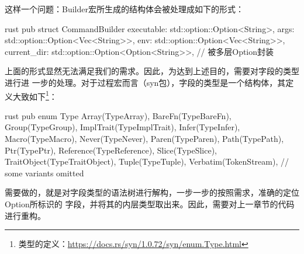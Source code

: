这样一个问题：Builder宏所生成的结构体会被处理成如下的形式：
\begin{code-block}{rust}
pub struct CommandBuilder {
    executable: std::option::Option<String>,
    args: std::option::Option<Vec<String>>,
    env: std::option::Option<Vec<String>>,
    current_dir: std::option::Option<Option<String>>,   // 被多层Option封装
}
\end{code-block}
上面的形式显然无法满足我们的需求。因此，为达到上述目的，需要对字段的类型进行进
一步的处理。对于过程宏而言（syn包），字段的类型是一个结构体，其定义大致如下\footnote{类型的定义：\url{https://docs.rs/syn/1.0.72/syn/enum.Type.html}}：
\begin{code-block}{rust}
pub enum Type {
    Array(TypeArray),
    BareFn(TypeBareFn),
    Group(TypeGroup),
    ImplTrait(TypeImplTrait),
    Infer(TypeInfer),
    Macro(TypeMacro),
    Never(TypeNever),
    Paren(TypeParen),
    Path(TypePath),
    Ptr(TypePtr),
    Reference(TypeReference),
    Slice(TypeSlice),
    TraitObject(TypeTraitObject),
    Tuple(TypeTuple),
    Verbatim(TokenStream),
    // some variants omitted
}
\end{code-block}

需要做的，就是对字段类型的语法树进行解构，一步一步的按照需求，准确的定位Option所标识的
字段，并将其的内层类型取出来。因此，需要对上一章节的代码进行重构。

